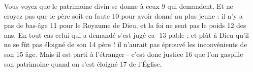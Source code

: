 Vous voyez que le patrimoine divin se donne à ceux	 
9	 	qui demandent. Et ne croyez pas que le père soit en faute	 
10	 	pour avoir donné au plus jeune : il n'y a pas de bas-âge	 
11	 	pour le Royaume de Dieu, et la foi ne sent pas le poids	 
12	 	des ans. En tout cas celui qui a demandé s'est jugé ca-	 
13	 	pable ; et plût à Dieu qu'il ne se fût pas éloigné de son	 
14	 	père ! il n'aurait pas éprouvé les inconvénients de son	 
15	 	âge. Mais il est parti à l'étranger - c'est donc justice	 
16	 	que l'on gaspille son patrimoine quand on s'est éloigné	 
17	 	de l'Église.